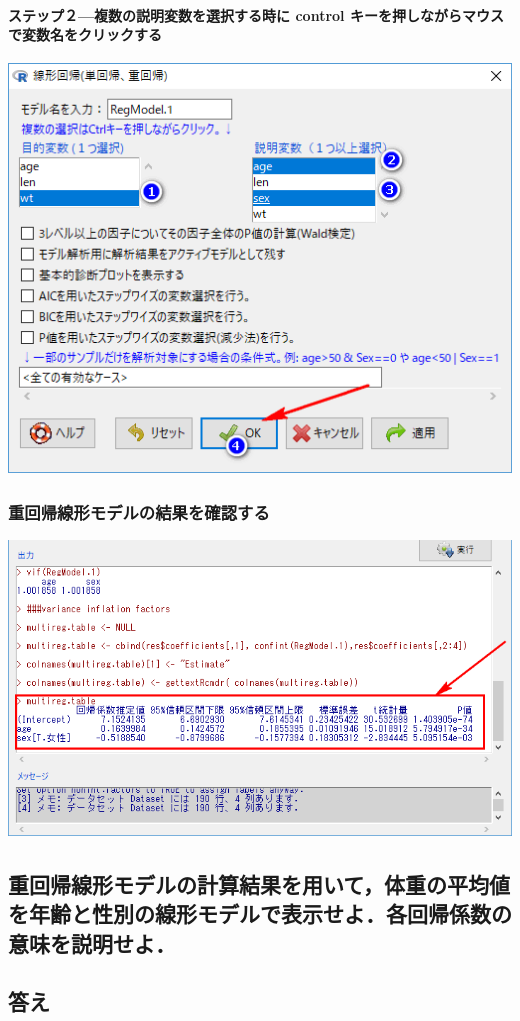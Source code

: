 \documentclass[11pt,]{problemset}
\let\oldparagraph\paragraph
\renewcommand{\paragraph}[1]{\oldparagraph{#1}\mbox{}}
\begin{document}
\paragraph{ステップ２---複数の説明変数を選択する時に control
キーを押しながらマウスで変数名をクリックする}\label{-control-}

\begin{center}\includegraphics[width=0.5\linewidth]{pic/lm04} \end{center}

\newpage

\vfill

\subsubsection{重回帰線形モデルの結果を確認する}

\begin{center}\includegraphics[width=0.8\linewidth]{pic/lm05} \end{center}

\subsection{重回帰線形モデルの計算結果を用いて，体重の平均値を年齢と性別の線形モデルで表示せよ．各回帰係数の意味を説明せよ．}

\subsection{答え}\label{-4}
\end{document}
